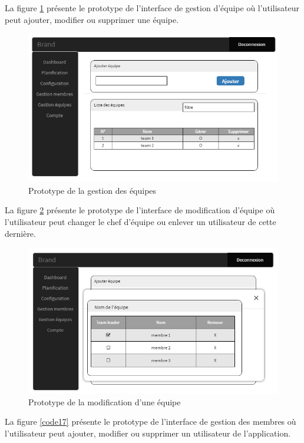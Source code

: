 La figure \ref{code15} présente le prototype de l'interface de gestion d'équipe où l'utilisateur peut ajouter, modifier ou supprimer une équipe.
\begin{figure}[H]
  \centering
  \includegraphics[scale=0.77]{figures/prototypes/Gestion_equipes_1.png}
  \caption{Prototype de la gestion des équipes}
  \label{code15}
\end{figure}
La figure \ref{code16} présente le prototype de l'interface de modification d'équipe où l'utilisateur peut changer le chef d'équipe ou enlever un utilisateur de cette dernière.
\begin{figure}[H]
  \centering
  \includegraphics[scale=0.77]{figures/prototypes/Gestion_equipes_2.png}
  \caption{Prototype de la modification d'une équipe}
  \label{code16}
\end{figure}
La figure \ref{code17} présente le prototype de l'interface de gestion des membres où l'utilisateur peut ajouter, modifier ou supprimer un utilisateur de l'application.
